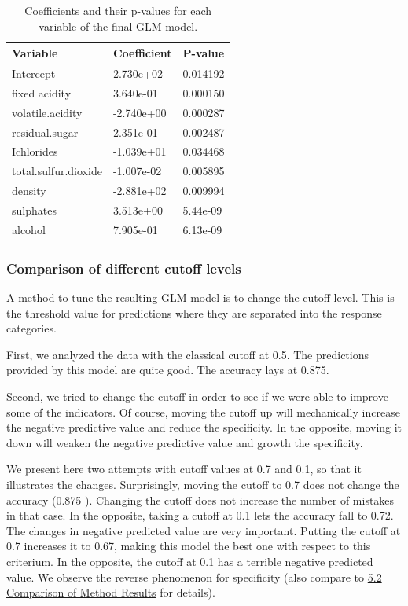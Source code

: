 \documentclass[11pt,]{article}
\begin{document}
\begin{table}[!h]
    \caption{\label{tabglm}Coefficients and their p-values for each variable of the final GLM model.}
    \centering  
    \begin{tabular}{lll} 
      \toprule
      Variable & Coefficient  & P-value \\ \midrule
      Intercept &   2.730e+02 & 0.014192     \\
      fixed acidity & 3.640e-01 &   0.000150     \\ 
      volatile.acidity &    -2.740e+00 &    0.000287     \\ 
      residual.sugar &  2.351e-01 & 0.002487     \\
      Ichlorides &  -1.039e+01 &    0.034468     \\
      total.sulfur.dioxide &    -1.007e-02 &    0.005895     \\
      density & -2.881e+02 & 0.009994    \\
      sulphates &   3.513e+00 & 5.44e-09     \\
      alcohol & 7.905e-01 & 6.13e-09     \\ \bottomrule
    \end{tabular}
\end{table}

\hypertarget{comparison-of-different-cutoff-levels}{%
\subsubsection{Comparison of different cutoff
levels}\label{comparison-of-different-cutoff-levels}}

A method to tune the resulting GLM model is to change the cutoff level.
This is the threshold value for predictions where they are separated
into the response categories.

First, we analyzed the data with the classical cutoff at 0.5. The
predictions provided by this model are quite good. The accuracy lays at
0.875.

Second, we tried to change the cutoff in order to see if we were able to
improve some of the indicators. Of course, moving the cutoff up will
mechanically increase the negative predictive value and reduce the
specificity. In the opposite, moving it down will weaken the negative
predictive value and growth the specificity.

We present here two attempts with cutoff values at 0.7 and 0.1, so that
it illustrates the changes. Surprisingly, moving the cutoff to 0.7 does
not change the accuracy (0.875 ). Changing the cutoff does not increase
the number of mistakes in that case. In the opposite, taking a cutoff at
0.1 lets the accuracy fall to 0.72. The changes in negative predicted
value are very important. Putting the cutoff at 0.7 increases it to
0.67, making this model the best one with respect to this criterium. In
the opposite, the cutoff at 0.1 has a terrible negative predicted value.
We observe the reverse phenomenon for specificity (also compare to
\protect\hyperlink{comparison-of-method-results}{5.2 Comparison of
Method Results} for details).
\end{document}
